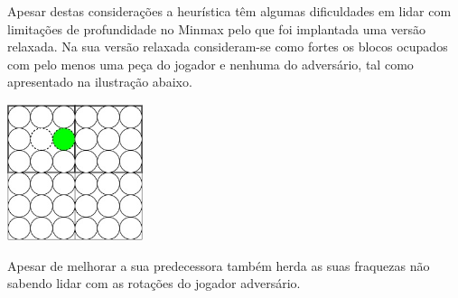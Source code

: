 Apesar destas considerações a heurística têm algumas dificuldades em lidar com  limitações de profundidade no Minmax pelo que foi implantada uma versão relaxada. Na sua versão relaxada consideram-se como fortes os blocos ocupados com pelo menos uma peça do jogador e nenhuma do adversário, tal como apresentado na ilustração abaixo.

\begin{table}[H]
\centering
\includegraphics[height=4cm]{images/h12_relax.jpg}
\end{table}

Apesar de melhorar a sua predecessora também herda as suas fraquezas não sabendo lidar com as rotações do jogador adversário.

